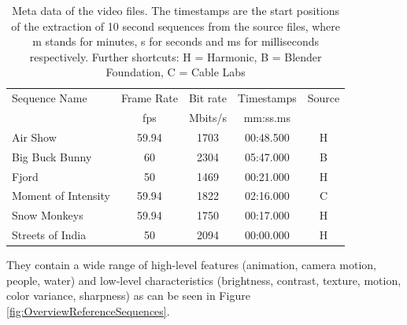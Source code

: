 \begin{table}[!t]
	\renewcommand{\arraystretch}{1.3}
	\centering
	\caption{Meta data of the video files. The timestamps are the start positions of the extraction of 10 second sequences from the source files, where m stands for minutes, s for seconds and ms for milliseconds respectively. Further shortcuts: H = Harmonic, B = Blender Foundation, C = Cable Labs}
	\label{tab:Specifications}
	\begin{tabular}{lcccc}
		\toprule
		Sequence Name       & Frame Rate & Bit rate & Timestamps & Source\\
							& fps  	   & Mbits/s    & mm:ss.ms   & \\
		\midrule
		Air Show            & 59.94    & 1703 & 00:48.500  &   H  \\
		Big Buck Bunny      & 60       & 2304 & 05:47.000  &   B  \\
		Fjord               & 50       & 1469 & 00:21.000  &   H  \\
		Moment of Intensity & 59.94    & 1822 & 02:16.000  &   C \\
		Snow Monkeys        & 59.94    & 1750 & 00:17.000  &   H  \\
		Streets of India    & 50       & 2094 & 00:00.000  &   H  \\
		\bottomrule
	\end{tabular}
\end{table}

They contain a wide range of high-level features (animation, camera motion, people, water) and low-level characteristics (brightness, contrast, texture, motion, color variance, sharpness) as can be seen in Figure \ref{fig:OverviewReferenceSequences}.

